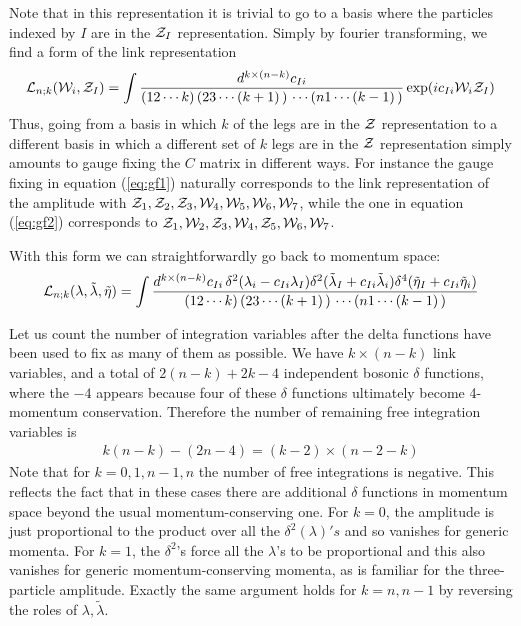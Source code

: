 \documentclass[12pt]{article}
\newcommand{\be}{\begin{eqnarray}}
\newcommand{\ee}{\end{eqnarray}}
\begin{document}
Note that in this representation it is trivial to go to a basis where the particles indexed by $I$ are in the ${\cal Z}_I$ representation.  Simply by fourier transforming, we find a form of the link representation \cite{ArkaniHamed:2009si}
\be
{\cal L}_{n;k}({\cal W}_i,{\cal Z}_I) = \int \frac{d^{k \times (n-k)} c_{Ii}} {(12\cdots k) \, (23\cdots (k+1) \,) \, \cdots (n 1 \cdots (k-1)\,)} \exp (i c_{Ii} {\cal W}_i {\cal Z}_I)
\ee
Thus, going from a basis in which $k$ of the legs are in the $\cal Z$ representation to a different basis in which a different set of $k$ legs are in the $\cal Z$ representation simply amounts to gauge fixing the $C$ matrix in different ways. For instance the gauge fixing in equation (\ref{eq:gf1}) naturally corresponds to
the link representation of the amplitude with
${\cal Z}_1,{\cal Z}_2,{\cal Z}_3,{\cal W}_4,{\cal W}_5,{\cal W}_6,{\cal W}_7$, while the one in equation (\ref{eq:gf2}) corresponds to ${\cal Z}_1,{\cal W}_2,{\cal Z}_3,
{\cal W}_4, {\cal Z}_5,{\cal W}_6,{\cal W}_7$.

With this form we can straightforwardly go back to momentum space:
\be
\label{finalform}
{\cal L}_{n;k}(\lambda,\tilde \lambda, \tilde \eta) = \int \frac{d^{k \times (n-k)} c_{Ii} \, \delta^2(\lambda_i - c_{Ii} \lambda_I)
\delta^2(\tilde \lambda_I + c_{Ii} \tilde \lambda_i) \delta^4(\tilde \eta_I + c_{Ii} \tilde \eta_i)}
{(12\cdots k) \, (23\cdots (k+1)\,) \, \cdots (n 1 \cdots (k-1)\,)}
\ee

Let us count the number of integration variables after the delta functions have been used to fix as many of them as possible. We have $k \times (n-k)$ link variables, and a total of $2(n-k) + 2k - 4$ independent bosonic $\delta$ functions, where the $-4$ appears because four of these $\delta$ functions ultimately become 4-momentum conservation.
Therefore the number of remaining free integration variables is
\be
k (n-k) - (2n - 4) = (k - 2) \times (n - 2 - k)
\ee
Note that for $k=0,1,n-1,n$ the number of free integrations is negative. This reflects the fact that in these cases there are additional
$\delta$ functions in momentum space beyond the usual momentum-conserving one. For $k=0$, the amplitude is just proportional to the product over
all the $\delta^2(\lambda)'s$ and so vanishes for generic momenta. For $k=1$, the $\delta^2$'s force all the $\lambda$'s to be proportional and this also vanishes for generic momentum-conserving momenta, as is familiar for the three-particle amplitude.
Exactly the same argument holds for
$k = n, n-1$ by reversing the roles of $\lambda, \tilde \lambda$.
\end{document}
